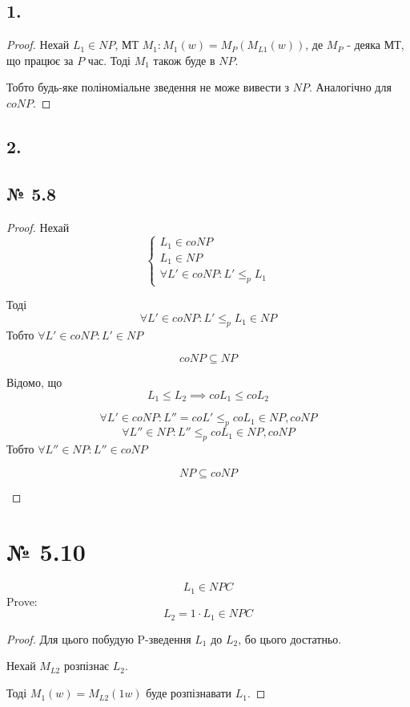 \documentclass[11pt, a4paper]{article} %
\begin{document}
\subsection*{1.}
\begin{proof}
    Нехай $L_1 \in NP$, МТ $M_1: M_1(w) = M_P(M_{L1}(w))$, де $M_P$ - деяка МТ, що працює за $P$ час.
    Тоді $M_1$ також буде в $NP$.

    Тобто будь-яке поліноміальне зведення не може вивести з $NP$. Аналогічно для $coNP$.
\end{proof}

\subsection*{2.}

\subsection*{№ 5.8}
\begin{proof}
    Нехай $$\begin{cases}
        L_1 \in coNP \\
        L_1 \in NP \\
        \forall L' \in coNP: L' \le_p L_1 
    \end{cases}$$

    Тоді
    $$\forall L' \in coNP: L' \le_p L_1 \in NP$$
    Тобто $\forall L' \in coNP: L' \in NP$
    \begin{mdframed}
        $$coNP \subseteq NP$$
    \end{mdframed}

    Відомо, що $$L_1 \le L_2 \implies coL_1 \le coL_2$$

    $$\forall L' \in coNP: L''=coL' \le_p coL_1 \in NP, coNP$$
    $$\forall L'' \in NP: L'' \le_p coL_1 \in NP, coNP$$
    Тобто $\forall L'' \in NP: L'' \in coNP$
    \begin{mdframed}
        $$NP \subseteq coNP$$
    \end{mdframed}
\end{proof}

\section*{№ 5.10}
\begin{mdframed}
    $$L_1 \in NPC$$
    Prove:
    $$L_2 = 1\cdot L_1 \in NPC$$
\end{mdframed}
\begin{proof}
    Для цього побудую P-зведення $L_1$ до $L_2$, бо цього достатньо.

    Нехай $M_{L2}$ розпізнає $L_2$.
    
    Тоді $M_1(w) = M_{L2}(1w)$ буде розпізнавати $L_1$.
\end{proof}
\end{document}
